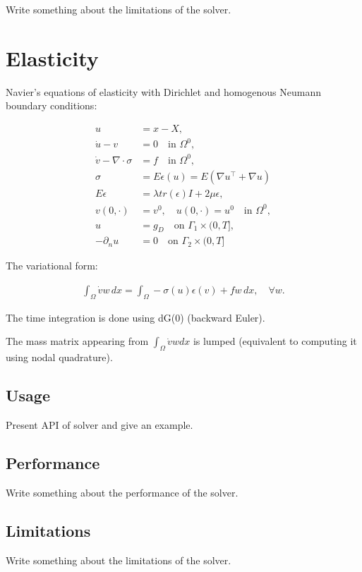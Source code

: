 Write something about the limitations of the solver.

\section{Elasticity}

Navier's equations of elasticity with Dirichlet and homogenous Neumann
boundary conditions:

\begin{equation*}
\label{classicalelast}
\begin{split}
u &= x - X,\\
\dot{u}-v &= 0\quad\mbox{in } \Omega^0,\\
\dot{v} - \nabla \cdot \sigma& =f \quad\mbox{in } \Omega^0,\\
\sigma &= E\epsilon (u) = E(\nabla u^\top +\nabla u)\\
E\epsilon &= \lambda tr(\epsilon) I + 2\mu \epsilon,\\
v(0,\cdot ) &= v^0,\quad u(0,\cdot ) = u^0\quad\mbox{in } \Omega^0, \\
u &= g_D \quad \mbox{on } \Gamma_1 \times (0,T], \\
- \partial_n u &= 0 \quad \mbox{on } \Gamma_2 \times (0,T]
\end{split}
\end{equation*}

The variational form:

\begin{equation} \label{eq:elasticity-varform}
\begin{array}{rcl}
  \int_{\Omega} \dot{v} w \, dx = \int_{\Omega} -\sigma(u) \epsilon(v) + f w \, dx,
  \quad \forall w.
\end{array}
\end{equation}

The time integration is done using dG(0) (backward Euler).

The mass matrix appearing from $\int_{\Omega} \dot{v} w dx$ is lumped
(equivalent to computing it using nodal quadrature).

\subsection{Usage}

Present API of solver and give an example.

\subsection{Performance}

Write something about the performance of the solver.

\subsection{Limitations}

Write something about the limitations of the solver.
